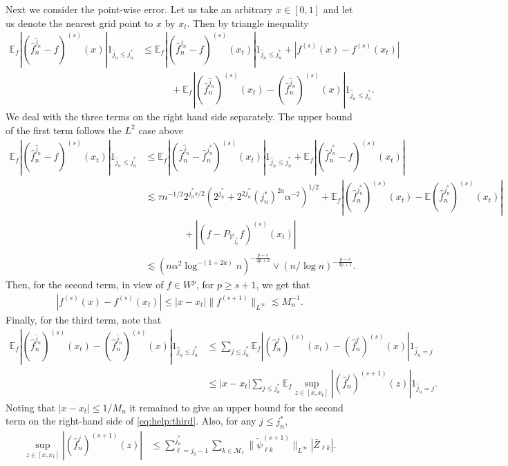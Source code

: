 \documentclass[preprint]{imsart}
\newcommand{\E}{{\mathbb E}}
\numberwithin{equation}{section}
\newcounter{cond}
\begin{document}
\begin{appendix}
Next we consider the point-wise error. Let us take an arbitrary $x\in[0,1]$ and let us denote the nearest grid point to $x$ by $x_t$. Then by triangle inequality
\begin{align}
\E_f|(\hat{f}_n^{\hat{j}_n}-f)^{(s)}(x)| 1_{\hat{j}_n\leq j_n^*}
&\leq \E_f|(\hat{f}_n^{\hat{j}_n}-f)^{(s)}(x_t)| 1_{\hat{j}_n\leq j_n^*}+|f^{(s)}(x)-f^{(s)}(x_t)|\nonumber\\
&\qquad\quad+\E_f|(\hat{f}_n^{\hat{j}_n})^{(s)}(x_t)-(\hat{f}_n^{\hat{j}_n})^{(s)}(x)| 1_{\hat{j}_n\leq j_n^*}.\label{eq:pointwise}
\end{align}
We deal with the three terms on the right hand side separately. The upper bound of the first term follows the $L^2$ case above
\begin{align*}
 \E_f|(\hat{f}_n^{\hat{j}_n}-f)^{(s)}(x_t)| 1_{\hat{j}_n\leq j_n^*}
&\leq    \E_f|(\hat{f}_n^{\hat{j}_n}-\hat{f}_n^{j_n^*})^{(s)}(x_t)| 1_{\hat{j}_n\leq j_n^*}+ \E_f|(\hat{f}_n^{j_n^*}-f)^{(s)}(x_t)|\\
&\lesssim \tau  n^{-1/2}2^{j_n^*s/2}(2^{j_n^*}+2^{2j_n^*}(j_n^*)^{2a}\alpha^{-2})^{1/2}+\E_f|(\hat{f}_n^{j_n^*})^{(s)}(x_t)-\E (\hat{f}_n^{j_n^*})^{(s)}(x_t)|\\
&\qquad\qquad + |(f-P_{\mathcal{V}_{j^*_n}}f)^{(s)}(x_t)|\\
&\lesssim   (n\alpha^2\log^{-(1+2a)} n)^{-\frac{p-s}{2p+2}}\vee (n/\log n)^{-\frac{p-s}{2p+1}}.
\end{align*}
Then, for the second term, in view of $f\in W^{p}$, for $p\geq s+1$, we get that
\begin{align*}
|f^{(s)}(x)-f^{(s)}(x_t)|\leq |x-x_t| \|f^{(s+1)}\|_{L^\infty}\lesssim M_n^{-1}.
\end{align*}
Finally, for the third term, note that
\begin{align}
\E_f|(\hat{f}_n^{\hat{j}_n})^{(s)}(x_t)-(\hat{f}_n^{\hat{j}_n})^{(s)}(x)| 1_{\hat{j}_n\leq j_n^*}
&\leq \sum_{j\leq j_n^*}\E_f|(\hat{f}_n^{j})^{(s)}(x_t)-(\hat{f}_n^{j})^{(s)}(x)| 1_{\hat{j}_n=j}\nonumber\\
&\leq  |x-x_t| \sum_{j\leq j_n^*}\E_f \sup_{z\in [x,x_t]}| (\hat{f}_n^{j})^{(s+1)}(z)|1_{\hat{j}_n=j}.\label{eq:help:third}
\end{align}
Noting that  $|x-x_t|\leq 1/M_n$ it remained to give an upper bound for the second term on the right-hand side of \eqref{eq:help:third}. Also, for any $j\leq j_n^*$, 
\begin{align*}\sup_{z\in [x,x_t]} | (\hat{f}_n^{j})^{(s+1)}(z)| 
&\leq \sum_{\ell =j_0-1}^{j_n^*}\sum_{k\in\mathcal{M}_\ell} \|\tilde\psi_{\ell k}^{(s+1)}\|_{L^\infty}  |\bar{Z}_{\ell k}|.

\end{align*}
\end{appendix}
\end{document}
